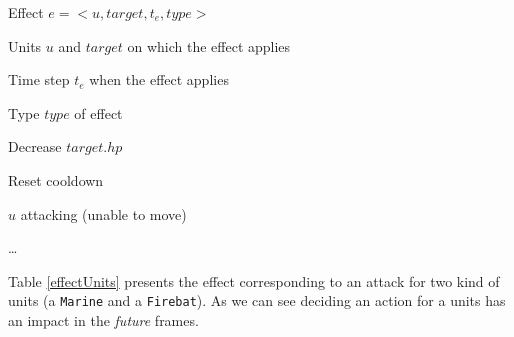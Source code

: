 \begin{descri}
\item[Effect] $e=<u,target,t_e,type>$
\begin{shortitem}
\item Units $u$ and $target$ on which the effect applies 
\item Time step $t_e$ when the effect applies
\item Type $type$ of effect
    \begin{shortitem}
    \item Decrease $target.hp$
    \item Reset cooldown
    \item $u$ attacking (unable to move)
    \item \dots
    \end{shortitem}
\end{shortitem}
\end{descri}

Table \ref{effectUnits} presents the effect corresponding to an attack for two kind of units (a \texttt{Marine} and a \texttt{Firebat}).
As we can see deciding an action for a units has an impact in the \emph{future} frames.

\begin{table}[h!t]
\\
\caption{Exemple of effects $e=<u,target,t_e,type>$}
\label{effectUnits}
\end{table}

